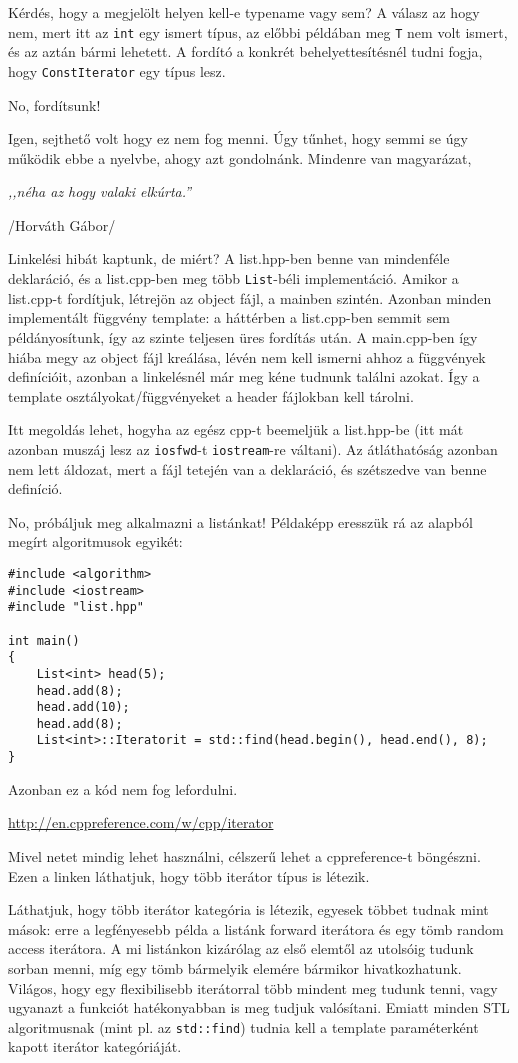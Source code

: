\documentclass[a4paper,11.5pt]{article}
\begin{document}
	Kérdés, hogy a megjelölt helyen kell-e typename vagy sem? A válasz az hogy nem, mert itt az \texttt{int} egy ismert típus, az előbbi példában meg \texttt{T} nem volt ismert, és az aztán bármi lehetett. A fordító a konkrét behelyettesítésnél tudni fogja, hogy \texttt{ConstIterator} egy típus lesz.
	
	\medskip
	No, fordítsunk!
	
	\medskip
	Igen, sejthető volt hogy ez nem fog menni. Úgy tűnhet, hogy semmi se úgy működik ebbe a nyelvbe, ahogy azt gondolnánk. Mindenre van magyarázat,
	\begin{center}
		\textit{,,néha az hogy valaki elkúrta.''}
		
		/Horváth Gábor/
	\end{center}
	Linkelési hibát kaptunk, de miért? A list.hpp-ben benne van mindenféle deklaráció, és a list.cpp-ben meg több \texttt{List}-béli implementáció. Amikor a list.cpp-t fordítjuk, létrejön az object fájl, a mainben szintén. Azonban minden implementált függvény template: a háttérben a list.cpp-ben semmit sem példányosítunk, így az szinte teljesen üres fordítás után. A main.cpp-ben így hiába megy az object fájl kreálása, lévén nem kell ismerni ahhoz a függvények definícióit, azonban a linkelésnél már meg kéne tudnunk találni azokat. Így a template osztályokat/függvényeket a header fájlokban kell tárolni.
	
	Itt megoldás lehet, hogyha az egész cpp-t beemeljük a list.hpp-be (itt mát azonban muszáj lesz az \texttt{iosfwd}-t \texttt{iostream}-re váltani). Az átláthatóság azonban nem lett áldozat, mert a fájl tetején van a deklaráció, és szétszedve van benne definíció.
	
	No, próbáljuk meg alkalmazni a listánkat! Példaképp eresszük rá az alapból megírt algoritmusok egyikét:
\begin{lstlisting}
#include <algorithm>
#include <iostream>
#include "list.hpp"

int main()
{
	List<int> head(5);
	head.add(8);
	head.add(10);
	head.add(8);
	List<int>::Iteratorit = std::find(head.begin(), head.end(), 8);
}
\end{lstlisting}
	Azonban ez a kód nem fog lefordulni.
	
	\url{http://en.cppreference.com/w/cpp/iterator}
	
	Mivel netet mindig lehet használni, célszerű lehet a cppreference-t böngészni. Ezen a linken láthatjuk, hogy több iterátor típus is létezik.
	
	Láthatjuk, hogy több iterátor kategória is létezik, egyesek többet tudnak mint mások: erre a legfényesebb példa a listánk forward iterátora és egy tömb random access iterátora. A mi listánkon kizárólag az első elemtől az utolsóig tudunk sorban menni, míg egy tömb bármelyik elemére bármikor hivatkozhatunk. Világos, hogy egy flexibilisebb iterátorral több mindent meg tudunk tenni, vagy ugyanazt a funkciót hatékonyabban is meg tudjuk valósítani. Emiatt minden STL algoritmusnak (mint pl. az \texttt{std::find}) tudnia kell a template paraméterként kapott iterátor kategóriáját.
	
\end{document}

